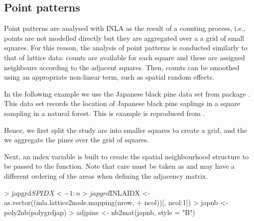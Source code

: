 \documentclass[article]{jss}
\begin{document}
\subsection{Point patterns}

Point patterns are analysed with INLA as the result of a counting process,
i.e., points are not modelled directly but they are aggregated over a a grid
of small squares. For this reason, the analysis of point patterns is conducted
similarly to that of lattice data: counts are available for each square and 
these are assigned neighbours according to the adjacent squares. Then, counts
can be smoothed using an appropriate non-linear term, such as spatial
random effects.

In the following example we use the Japanese black pine data set from
 package . This data set records the location of
Japanese black pine saplings in a square sampling in a natural forest.  This
is example is reproduced from \citet{GomezRubioetal:2013}.

Hence, we first split the study are into smaller squares to create a
grid, and the we aggregate the pines over the grid of squares. 

\begin{Schunk}
\end{Schunk}


Next, an index variable is built to create the spatial neighbourhood structure
to be passed to the  function. Note that care must be taken as
 and  may have a different ordering of the areas when
defining the adjacency matrix.

\begin{Schunk}
\begin{Sinput}
> japgrd$SPIDX <- 1:n
> japgrd$INLAIDX <- as.vector((inla.lattice2node.mapping(nrow, 
+     ncol))[, ncol:1])
> japnb <- poly2nb(polygrdjap)
> adjpine <- nb2mat(japnb, style = "B")
\end{Sinput}
\end{Schunk}
\end{document}
